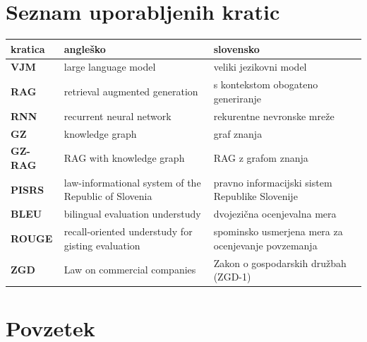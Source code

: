 \documentclass[a4paper,12pt,openright]{book}
\newcommand{\clearemptydoublepage}{\newpage{\pagestyle{empty}\cleardoublepage}}
\begin{document}

\chapter*{Seznam uporabljenih kratic}

\noindent\begin{tabular}{p{}|p{}|p{}}    %
	{\bf kratica} & {\bf angleško}                                       & {\bf slovensko}                                    \\ \hline
	{\bf VJM}     & large language model                                 & veliki jezikovni model                             \\
	{\bf RAG}     & retrieval augmented generation                       & s kontekstom obogateno generiranje                 \\
	{\bf RNN}     & recurrent neural network                             & rekurentne nevronske mreže                         \\
	{\bf GZ}      & knowledge graph                                      & graf znanja                                        \\
	{\bf GZ-RAG}  & RAG with knowledge graph                             & RAG z grafom znanja                                \\
	{\bf PISRS}   & law-informational system of the Republic of Slovenia & pravno informacijski sistem Republike Slovenije    \\
	{\bf BLEU}    & bilingual evaluation understudy                      & dvojezična ocenjevalna mera                        \\
	{\bf ROUGE\;} & recall-oriented understudy for gisting evaluation    & spominsko usmerjena mera za ocenjevanje povzemanja \\
	{\bf ZGD}     & Law on commercial companies                          & Zakon o gospodarskih družbah (ZGD-1)
\end{tabular}


\clearemptydoublepage

{}
\chapter*{Povzetek}
\end{document}
